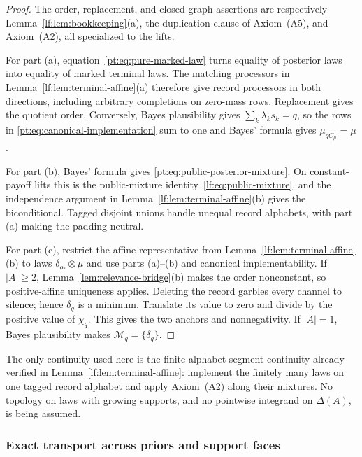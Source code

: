 \begin{proof}
The order, replacement, and closed-graph assertions are respectively
Lemma~\ref{lf:lem:bookkeeping}\textup{(a)}, the duplication clause of
Axiom~\textup{(A5)}, and Axiom~\textup{(A2)}, all specialized to the lifts.

For part \textup{(a)}, equation~\eqref{pt:eq:pure-marked-law} turns equality
of posterior laws into equality of marked terminal laws.  The matching
processors in Lemma~\ref{lf:lem:terminal-affine}\textup{(a)} therefore give
record processors in both directions, including arbitrary completions on
zero-mass rows.  Replacement gives the quotient order.  Conversely, Bayes
plausibility gives $\sum_k\lambda_ks_k=q$, so the rows in
\eqref{pt:eq:canonical-implementation} sum to one and Bayes' formula gives
$\mu_{qC_\mu}=\mu$.

For part \textup{(b)}, Bayes' formula gives
\eqref{pt:eq:public-posterior-mixture}.  On constant-payoff lifts this is the
public-mixture identity~\eqref{lf:eq:public-mixture}, and the independence
argument in Lemma~\ref{lf:lem:terminal-affine}\textup{(b)} gives the
biconditional.  Tagged disjoint unions handle unequal record alphabets, with
part \textup{(a)} making the padding neutral.

For part \textup{(c)}, restrict the affine representative from
Lemma~\ref{lf:lem:terminal-affine}\textup{(b)} to laws
$\delta_{o_\ast}\otimes\mu$ and use parts \textup{(a)--(b)} and canonical
implementability.  If $|A|\ge2$, Lemma~\ref{lem:relevance-bridge}\textup{(b)}
makes the order nonconstant, so positive-affine uniqueness applies.  Deleting
the record garbles every channel to silence; hence $\delta_q$ is a minimum.
Translate its value to zero and divide by the positive value of $\chi_q$.
This gives the two anchors and nonnegativity.  If $|A|=1$, Bayes plausibility
makes $\mathcal M_q=\{\delta_q\}$.
\end{proof}

The only continuity used here is the finite-alphabet segment continuity
already verified in Lemma~\ref{lf:lem:terminal-affine}: implement the finitely
many laws on one tagged record alphabet and apply Axiom~\textup{(A2)} along
their mixtures.  No topology on laws with growing supports, and no pointwise
integrand on $\Delta(A)$, is being assumed.

\subsubsection{Exact transport across priors and support faces}

